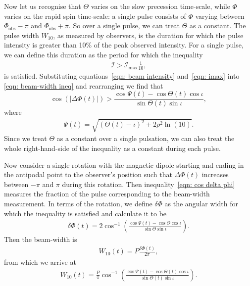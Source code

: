 \documentclass[../full_thesis/full_thesis.tex]{subfiles}
\newcommand{\PhiO}{\Phi_{\mathrm{obs}}}
\newcommand{\In}{\mathcal{I}}
\begin{document}
Now let us recognise that $\Theta$ varies on the slow precession time-scale,
while $\Phi$ varies on the rapid spin time-scale: a single pulse consists of
$\Phi$ varying between $\PhiO - \pi$ and $\PhiO + \pi$. So over a single pulse,
we can treat $\Theta$ as a constant. The pulse width $W_{10}$, as measured by
observers, is the duration for which the pulse intensity is greater than 10\%
of the peak observed intensity. For a single pulse, we can define this duration
as the period for which the inequality
\begin{align}
\In > \In_{\textrm{max}} \frac{1}{10},
\label{eqn: beam-width ineq}
\end{align}
is satisfied.  Substituting equations~\eqref{eqn: beam intensity}
and~\eqref{eqn: imax} into \eqref{eqn: beam-width ineq} and rearranging we find
that
\begin{equation}
\cos(|\Delta\Phi(t)|) > \frac{\cos\Psi(t)-\cos\Theta(t)\cos\iota}
    {\sin\Theta(t)\sin\iota},
\label{eqn: cos delta phi}
\end{equation}
where
\begin{align}
\Psi(t) = \sqrt{
    \left(\Theta(t) - \iota\right)^{2} +
     2\rho^{2} \ln\left(10\right)}.
\label{eqn: Psi}
\end{align}
Since we treat $\Theta$ as a constant over a single pulsation, we can also treat
the whole right-hand-side of the inequality as a constant during each pulse.

Now consider a single rotation with the magnetic dipole starting and ending in
the antipodal point to the observer's position such that $\Delta\Phi(t)$ increases
between $-\pi$ and $\pi$ during this rotation. Then inequality~\eqref{eqn: cos delta phi} measures the fraction of the pulse corresponding to
the beam-width measurement. In terms of the rotation, we define $\delta\Phi$ as
the angular width for which the inequality is satisfied and calculate it to be
\begin{align}
\delta\Phi(t) = 2\cos^{-1}\left(
\frac{\cos\Psi(t)-\cos\Theta\cos\iota}
    {\sin\Theta\sin\iota}
\right).
\end{align}
Then the beam-width is
\begin{align}
W_{10}(t) = P \frac{\delta\Phi(t)}{2\pi},
\end{align}
from which we arrive at
\begin{align}
W_{10}(t) = \frac{P}{\pi} \cos^{-1}\left(
\frac{\cos \Psi(t) - \cos\Theta(t)\cos\iota}{\sin\Theta(t)\sin\iota}
\right).
\label{eqn: w10 beam-width gaussian}
\end{align}
\end{document}
